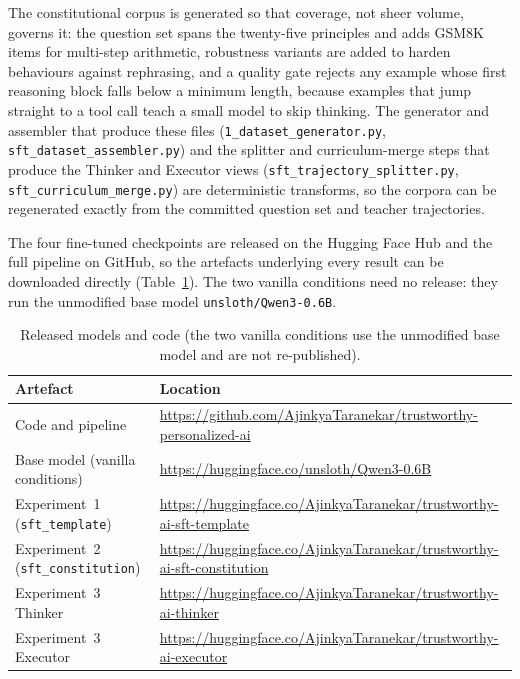 The constitutional corpus is generated so that coverage, not sheer volume, governs it: the question set spans the twenty-five principles and adds GSM8K items for multi-step arithmetic, robustness variants are added to harden behaviours against rephrasing, and a quality gate rejects any example whose first reasoning block falls below a minimum length, because examples that jump straight to a tool call teach a small model to skip thinking. The generator and assembler that produce these files (\texttt{1\_dataset\_generator.py}, \texttt{sft\_dataset\_assembler.py}) and the splitter and curriculum-merge steps that produce the Thinker and Executor views (\texttt{sft\_trajectory\_splitter.py}, \texttt{sft\_curriculum\_merge.py}) are deterministic transforms, so the corpora can be regenerated exactly from the committed question set and teacher trajectories.

The four fine-tuned checkpoints are released on the Hugging Face Hub and the full pipeline on GitHub, so the artefacts underlying every result can be downloaded directly (Table~\ref{tab:released-artefacts}). The two vanilla conditions need no release: they run the unmodified base model \texttt{unsloth/Qwen3-0.6B}.

\begin{table}[H]
  \centering
  \caption{Released models and code (the two vanilla conditions use the unmodified base model and are not re-published).}
  \label{tab:released-artefacts}
  \begin{tabular}{l p{9.6cm}}
    \toprule
    Artefact & Location \\
    \midrule
    Code and pipeline & \url{https://github.com/AjinkyaTaranekar/trustworthy-personalized-ai} \\
    Base model (vanilla conditions) & \url{https://huggingface.co/unsloth/Qwen3-0.6B} \\
    Experiment~1 (\texttt{sft\_template}) & \url{https://huggingface.co/AjinkyaTaranekar/trustworthy-ai-sft-template} \\
    Experiment~2 (\texttt{sft\_constitution}) & \url{https://huggingface.co/AjinkyaTaranekar/trustworthy-ai-sft-constitution} \\
    Experiment~3 Thinker & \url{https://huggingface.co/AjinkyaTaranekar/trustworthy-ai-thinker} \\
    Experiment~3 Executor & \url{https://huggingface.co/AjinkyaTaranekar/trustworthy-ai-executor} \\
    \bottomrule
  \end{tabular}
\end{table}

